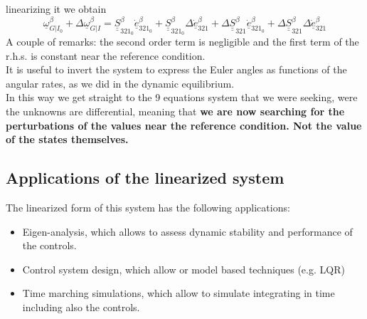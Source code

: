 linearizing it we obtain
\begin{equation}
    \underline{\omega}_{G|I_0}^\beta + \Delta\underline{\omega}_{G|I}^\beta = \underline{\underline{S}}_{321_0}^\beta \underline{\dot e}_{321_0}^\beta + \underline{\underline{S}}_{321_0}^\beta \Delta\underline{\dot e}_{321}^\beta + \Delta \underline{\underline{S}}_{321}^\beta \underline{\dot e}_{321_0}^\beta + \Delta\underline{\underline{S}}_{321}^\beta \Delta \underline{\dot e}_{321}^\beta
\end{equation}
A couple of remarks: the second order term is negligible and the first term of the r.h.s. is constant near the reference condition.
\\
It is useful to invert the system to express the Euler angles as functions of the angular rates, as we did in the dynamic equilibrium.
\\
In this way we get straight to the 9 equations system that we were seeking, were the unknowns are differential, meaning that \textbf{we are now searching for the perturbations of the values near the reference condition. Not the value of the states themselves.}
\subsection{Applications of the linearized system}
The linearized form of this system has the following applications:
\begin{itemize}
    \item Eigen-analysis, which allows to assess dynamic stability and performance of the controls.
    \item Control system design, which allow or model based techniques (e.g. LQR)
    \item Time marching simulations, which allow to simulate integrating in time including also the controls.
\end{itemize}

